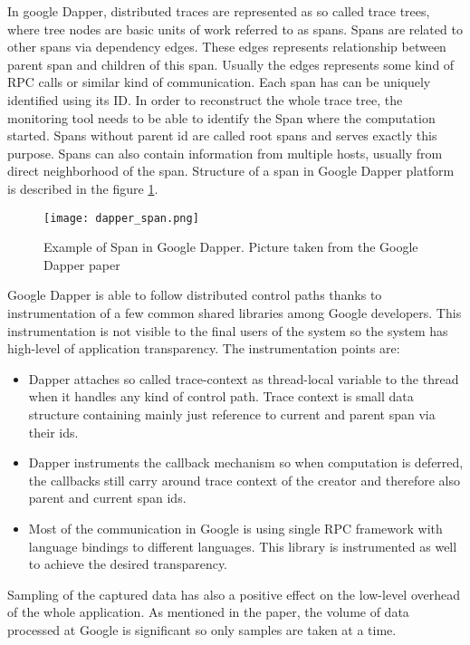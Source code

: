 In google Dapper, distributed traces are represented as so called trace trees, where tree nodes are basic units of work referred to as spans. Spans are related to other spans via dependency edges. These edges represents relationship between parent span and children of this span. Usually the edges represents some kind of RPC calls or similar kind of communication. Each span has can be uniquely identified using its ID. In order to reconstruct the whole trace tree, the monitoring tool needs to be able to identify the Span where the computation started. Spans without parent id are called root spans and serves exactly this purpose. Spans can also contain information from multiple hosts, usually from direct neighborhood of the span. Structure of a span in Google Dapper platform is described in the figure \ref{fig:dapper_span}.
\begin{figure}
	\centering
		\texttt{[image: dapper\_span.png]}
	\caption{Example of Span in Google Dapper. Picture taken from the Google Dapper paper}
	\label{fig:dapper_span}
\end{figure}

Google Dapper is able to follow distributed control paths thanks to instrumentation of a few common shared libraries among Google developers. This instrumentation is not visible to the final users of the system so the system has high-level of application transparency. The instrumentation points are:
\begin{itemize}
	\item Dapper attaches so called trace-context as thread-local variable to the thread when it handles any kind of control path. Trace context is small data structure containing mainly just reference to current and parent span via their ids.
	
	\item Dapper instruments the callback mechanism so when computation is deferred, the callbacks still carry around trace context of the creator and therefore also parent and current span ids.
	
	\item Most of the communication in Google is using single RPC framework with language bindings to different languages. This library is instrumented as well to achieve the desired transparency.
\end{itemize}

Sampling of the captured data has also a positive effect on the low-level overhead of the whole application. As mentioned in the paper, the volume of data processed at Google is significant so only samples are taken at a time.

